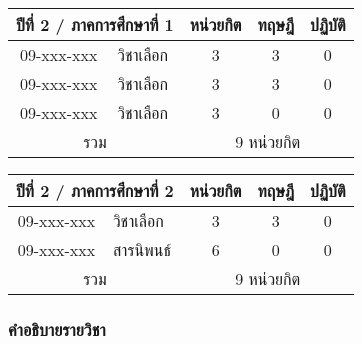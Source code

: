 \vspace{5ex}\par\noindent
\renewcommand{\arraystretch}{1.4}
\begin{tabular}{|cp{}|ccc|}
\hline
\multicolumn{2}{|c|}{ปีที่ 2 / ภาคการศึกษาที่ 1} & \multicolumn{1}{c|}{หน่วยกิต} & \multicolumn{1}{c|}{ทฤษฎี} & \multicolumn{1}{c|}{ปฏิบัติ}  \\ \hline
\multicolumn{1}{|c|}{09-xxx-xxx}  & วิชาเลือก  & \multicolumn{1}{c|}{3}        & \multicolumn{1}{c|}{3}     & \multicolumn{1}{c|}{0}                    \\ \hline
\multicolumn{1}{|c|}{09-xxx-xxx}  & วิชาเลือก  & \multicolumn{1}{c|}{3}        & \multicolumn{1}{c|}{3}     & \multicolumn{1}{c|}{0}                    \\ \hline
\multicolumn{1}{|c|}{09-xxx-xxx}  & วิชาเลือก & \multicolumn{1}{c|}{3}        & \multicolumn{1}{c|}{0}     & \multicolumn{1}{c|}{0}                    \\ \hline
\multicolumn{2}{|c|}{รวม}                        & \multicolumn{3}{c|}{9 หน่วยกิต}                                                                            \\ \hline
\end{tabular}

\vspace{5ex}\par\noindent
\renewcommand{\arraystretch}{1.4}
\begin{tabular}{|cp{}|ccc|}
\hline
\multicolumn{2}{|c|}{ปีที่ 2 / ภาคการศึกษาที่ 2} & \multicolumn{1}{c|}{หน่วยกิต} & \multicolumn{1}{c|}{ทฤษฎี} & \multicolumn{1}{c|}{ปฏิบัติ}  \\ \hline
\multicolumn{1}{|c|}{09-xxx-xxx}  & วิชาเลือก  & \multicolumn{1}{c|}{3}        & \multicolumn{1}{c|}{3}     & \multicolumn{1}{c|}{0}                    \\ \hline
\multicolumn{1}{|c|}{09-xxx-xxx}  & สารนิพนธ์ & \multicolumn{1}{c|}{6}        & \multicolumn{1}{c|}{0}     & \multicolumn{1}{c|}{0}                    \\ \hline
\multicolumn{2}{|c|}{รวม}                        & \multicolumn{3}{c|}{9 หน่วยกิต}                                                                            \\ \hline
\end{tabular}


\clearpage
\subsubsection{คำอธิบายรายวิชา}

